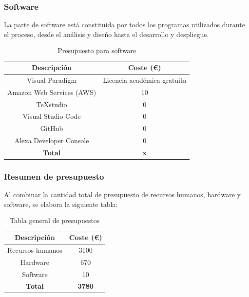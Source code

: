 \subsubsection{Software}
La parte de software está constituida por todos los programas utilizados durante el proceso, desde el análisis y diseño hasta el desarrollo y despliegue.  

\begin{table}[H]
    \centering
    \begin{tabular}{|c|c|}
    \hline
    \rowcolor{lightgray}
    \textbf{Descripción} & \textbf{Coste (€)}\\
    \hline
    Visual Paradigm & Licencia académica gratuita \\
    \hline
    Amazon Web Services (AWS) & 10 \\
    \hline
    TeXstudio & 0 \\
    \hline
    Visual Studio Code & 0 \\
    \hline
    GitHub & 0 \\
    \hline
    Alexa Developer Console & 0 \\
    \hline
    \textbf{Total} & \textbf{x} \\
    \hline
    \end{tabular}
    \caption{Presupuesto para software}
    \label{tab:presupuesto-sw}
\end{table}

\subsubsection{Resumen de presupuesto}
Al combinar la cantidad total de presupuesto de recursos humanos, hardware y software, se elabora la siguiente tabla:

\begin{table}[H]
    \centering
    \begin{tabular}{|c|c|}
        \hline
        \rowcolor{lightgray}
        \textbf{Descripción} & \textbf{Coste (€)} \\
        \hline
        Recursos humanos & 3100 \\
        \hline
        Hardware & 670 \\
        \hline
        Software & 10 \\
        \hline
        \textbf{Total} & \textbf{3780} \\
        \hline
    \end{tabular}
    \caption{Tabla general de presupuestos}
    \label{tab:presupuesto-total}
\end{table}
